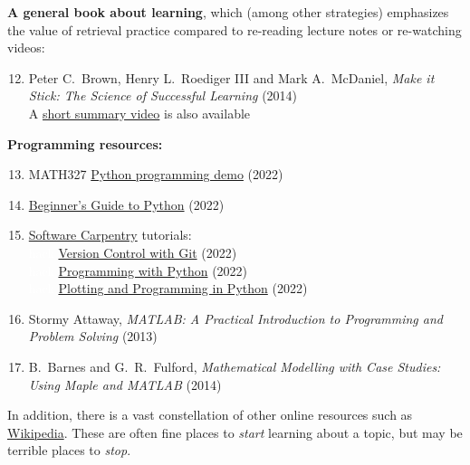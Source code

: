 \noindent\textbf{A general book about learning}, which (among other strategies) emphasizes the value of retrieval practice compared to re-reading lecture notes or re-watching videos: \\[-24 pt]
\begin{enumerate}
  \setcounter{enumi}{11}
  \item Peter C.~Brown, Henry L.~Roediger III and Mark A.~McDaniel, \textit{Make it Stick: The Science of Successful Learning} (2014) \\
        A \href{https://www.youtube.com/watch?v=MfylloWuuZU}{short summary video} is also available
\end{enumerate}

\noindent\textbf{Programming resources:} \\[-24 pt]
\begin{enumerate}
  \setcounter{enumi}{12}
  \item MATH327 \href{https://tinyurl.com/math327demo}{Python programming demo} (2022)
  \item \href{https://wiki.python.org/moin/BeginnersGuide}{Beginner's Guide to Python} (2022)
  \item \href{https://software-carpentry.org}{Software Carpentry} tutorials: \\
        \textcolor{white}{hack} \href{https://swcarpentry.github.io/git-novice/}{Version Control with Git} (2022) \\
        \textcolor{white}{hack} \href{https://swcarpentry.github.io/python-novice-inflammation/}{Programming with Python} (2022) \\
        \textcolor{white}{hack} \href{https://swcarpentry.github.io/python-novice-gapminder/}{Plotting and Programming in Python} (2022)
  \item Stormy Attaway, \textit{MATLAB: A Practical Introduction to Programming and Problem Solving} (2013)
  \item B.~Barnes and G.~R.~Fulford, \textit{Mathematical Modelling with Case Studies: Using Maple and MATLAB} (2014)
\end{enumerate}

In addition, there is a vast constellation of other online resources such as \href{https://en.wikipedia.org/wiki/Statistical_physics}{Wikipedia}.
These are often fine places to \emph{start} learning about a topic, but may be terrible places to \emph{stop}.
